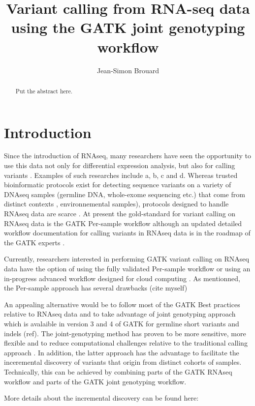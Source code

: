 \documentclass[]{article}
\title{Variant calling from RNA-seq data using the GATK joint genotyping workflow}
\author{Jean-Simon Brouard}
\begin{document}
\maketitle

\begin{abstract}
Put the abstract here.
\end{abstract}

\section{Introduction}
Since the introduction of RNAseq, many researchers have seen the opportunity to use this data not only for differential expression analysis, but also for calling variants \cite{Piskol2013}. Examples of such researches include a, b, c and d. Whereas trusted bioinformatic protocols exist for detecting sequence variants on a variety of DNAseq samples (germline DNA, whole-exome sequencing etc.) that come from distinct contexts \cite{Koboldt2020}, environnemental samples), protocols designed to handle RNAseq data are scarce \cite{Piskol2013}. At present the gold-standard for variant calling on RNAseq data is the GATK Per-sample workflow although an updated detailed workflow documentation for calling variants in RNAseq data is in the roadmap of the GATK experts \cite{GATK_best_RNAseq}.


Currently, researchers interested in performing GATK variant calling on RNAseq data have the option of using the fully validated Per-sample workflow \cite{GATK_RNAseq_variant_discovery} or using an in-progress advanced workflow designed for cloud computing \cite{GATK_gatk4_rnaseq_github}.
As mentionned, the Per-sample approach has several drawbacks (cite myself)

An appealing alternative would be to follow most of the GATK Best practices relative to RNAseq data and to take advantage of joint genotyping approach which is avalaible in version 3 and 4 of GATK for germline short variants and indels (ref). The joint-genotyping method has proven to be more sensitive, more flexible and to reduce computational challenges relative to the traditional calling approach \cite{GATK_jointCalling_1}. In addition, the latter approach has the advantage to facilitate the inceremental discovery of variants that origin from distinct cohorts of samples. Technically, this can be achieved by combining parts of the GATK RNAseq workflow and parts of the GATK joint genotyping workflow.

More details about the incremental discovery can be found here:
\end{document}
